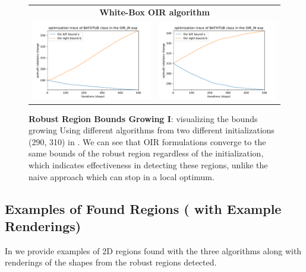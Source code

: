 \begin{figure}[h]
\begin{tabular}{c|c}
\multicolumn{2}{c}{\textbf{White-Box OIR algorithm}} \\ 
\includegraphics[width = 9cm]{supimages/converge/run2_1_1_OIR_W.pdf} &
\includegraphics[width = 9cm]{supimages/converge/run3_1_1_OIR_W.pdf} \\   \hline
\end{tabular}
   \caption{\small \textbf{Robust Region Bounds Growing I}: visualizing the bounds growing Using different algorithms from two different initializations (290, 310) in \figLabel{\ref{fig:converge}}. We can see that OIR formulations converge to the same bounds of the robust region regardless of the initialization, which indicates effectiveness in detecting these regions, unlike the naive approach which can stop in a local optimum. }
   \vspace{-8pt}
   \label{fig:conv2}
\end{figure}


\subsection{Examples of Found Regions ( with Example Renderings)}
In \figLabel{\ref{fig:ex1},\ref{fig:ex2}} we provide examples of 2D regions found with the three algorithms along with renderings of the shapes from the robust regions detected.

